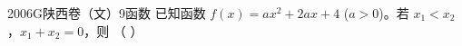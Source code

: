 
\begin{problem}{2006}{G}{陕西卷（文）}{9}{函数}
已知函数 $ f(x) = ax^2 + 2ax + 4 $ ($ a > 0 $)。若 $ x_1 < x_2 $，$ x_1 + x_2 = 0 $，则 （ ）
\begin{choices}
\end{choices}
\end{problem}

\begin{answer}

\end{answer}

\begin{solutions}

\end{solutions}